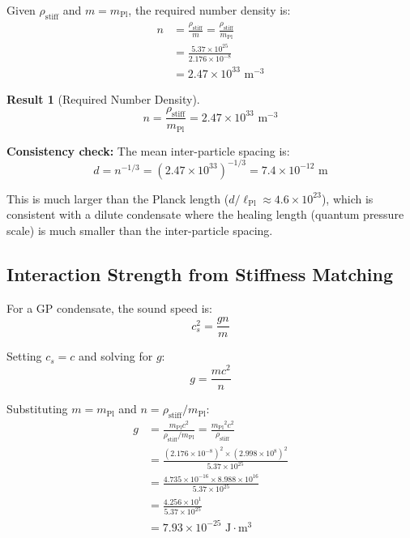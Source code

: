\documentclass[11pt,a4paper]{article}
\newcommand{\ee}[1]{\times 10^{#1}}
\newcommand{\lPl}{\ensuremath{\ell_{\mathrm{Pl}}}}
\newcommand{\mPl}{\ensuremath{m_{\mathrm{Pl}}}}
\newcommand{\rhostiff}{\ensuremath{\rho_{\mathrm{stiff}}}}
\newtheorem{result}{Result}
\theoremstyle{definition}
\begin{document}
Given $\rhostiff$ and $m = \mPl$, the required number density is:
\begin{align}
n &= \frac{\rhostiff}{m} = \frac{\rhostiff}{\mPl} \nonumber \\
&= \frac{5.37 \ee{25}}{2.176 \ee{-8}} \nonumber \\
&= 2.47 \ee{33} \text{ m}^{-3}
\end{align}

\begin{result}[Required Number Density]
\begin{equation}
\boxed{n = \frac{\rhostiff}{\mPl} = 2.47 \times 10^{33} \text{ m}^{-3}}
\end{equation}
\end{result}

\textbf{Consistency check:} The mean inter-particle spacing is:
\begin{equation}
d = n^{-1/3} = (2.47 \ee{33})^{-1/3} = 7.4 \ee{-12} \text{ m}
\end{equation}

This is much larger than the Planck length ($d/\lPl \approx 4.6 \ee{23}$), which is consistent with a dilute condensate where the healing length (quantum pressure scale) is much smaller than the inter-particle spacing.

\subsection{Interaction Strength from Stiffness Matching}
\label{sec:interaction_strength}

For a GP condensate, the sound speed is:
\begin{equation}
c_s^2 = \frac{gn}{m}
\end{equation}

Setting $c_s = c$ and solving for $g$:
\begin{equation}
g = \frac{m c^2}{n}
\end{equation}

Substituting $m = \mPl$ and $n = \rhostiff/\mPl$:
\begin{align}
g &= \frac{\mPl c^2}{\rhostiff/\mPl} = \frac{\mPl^2 c^2}{\rhostiff} \nonumber \\
&= \frac{(2.176 \ee{-8})^2 \times (2.998 \ee{8})^2}{5.37 \ee{25}} \nonumber \\
&= \frac{4.735 \ee{-16} \times 8.988 \ee{16}}{5.37 \ee{25}} \nonumber \\
&= \frac{4.256 \ee{1}}{5.37 \ee{25}} \nonumber \\
&= 7.93 \ee{-25} \text{ J}\cdot\text{m}^3
\end{align}
\end{document}
